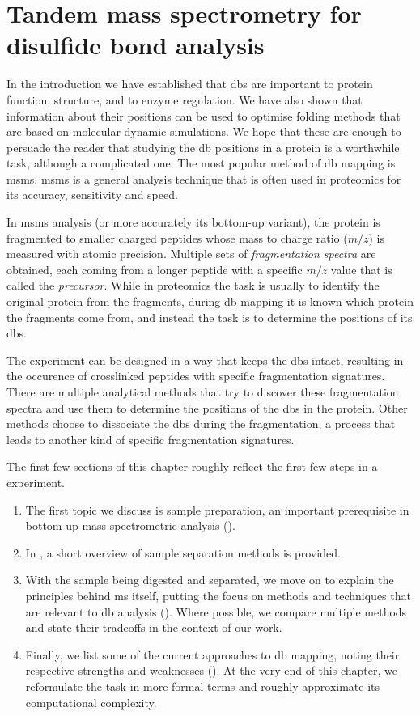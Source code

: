 \chapter{Tandem mass spectrometry for disulfide bond analysis}

In the introduction we have established that \glspl*{db} are important to protein function, structure, and to enzyme regulation. We have also shown that information about their positions can be used to optimise folding methods that are based on molecular dynamic simulations. We hope that these are enough to persuade the reader that studying the \gls*{db} positions in a protein is a worthwhile task, although a complicated one. The most popular method of \gls*{db} mapping is \gls*{msms}. \gls*{msms} is a general analysis technique that is often used in proteomics for its accuracy, sensitivity and speed.~\cite{gorman2002protein}

In \gls*{msms} analysis (or more accurately its bottom-up variant), the protein is fragmented to smaller charged peptides whose mass to charge ratio (\(m/z\)) is measured with atomic precision. Multiple sets of \emph{fragmentation spectra} are obtained, each coming from a longer peptide with a specific \(m/z\) value that is called the \emph{precursor}. While in proteomics the task is usually to identify the original protein from the fragments, during \gls*{db} mapping it is known which protein the fragments come from, and instead the task is to determine the positions of its \glspl*{db}.

The experiment can be designed in a way that keeps the \glspl*{db} intact, resulting in the occurence of crosslinked peptides with specific fragmentation signatures. There are multiple analytical methods that try to discover these fragmentation spectra and use them to determine the positions of the \glspl*{db} in the protein. Other methods choose to dissociate the \glspl*{db} during the fragmentation, a process that leads to another kind of specific fragmentation signatures.

The first few sections of this chapter roughly reflect the first few steps in a  experiment.

\begin{enumerate}
  \item The first topic we discuss is sample preparation, an important prerequisite in bottom-up mass spectrometric analysis ().
  \item In , a short overview of sample separation methods is provided.
  \item With the sample being digested and separated, we move on to explain the principles behind \gls*{ms} itself, putting the focus on methods and techniques that are relevant to \gls*{db} analysis (). Where possible, we compare multiple methods and state their tradeoffs in the context of our work.
  \item Finally, we list some of the current approaches to \gls*{db} mapping, noting their respective strengths and weaknesses (). At the very end of this chapter, we reformulate the task in more formal terms and roughly approximate its computational complexity.
\end{enumerate}

